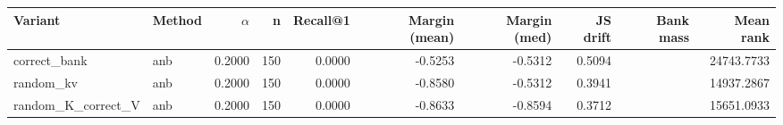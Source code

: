 \begin{tabular}{l l r r r r r r r r}
\toprule
Variant & Method & $\alpha$ & n & Recall@1 & Margin (mean) & Margin (med) & JS drift & Bank mass & Mean rank \\
\midrule
correct\_bank & anb & 0.2000 & 150 & 0.0000 & -0.5253 & -0.5312 & 0.5094 &  & 24743.7733 \\
random\_kv & anb & 0.2000 & 150 & 0.0000 & -0.8580 & -0.5312 & 0.3941 &  & 14937.2867 \\
random\_K\_correct\_V & anb & 0.2000 & 150 & 0.0000 & -0.8633 & -0.8594 & 0.3712 &  & 15651.0933 \\
\bottomrule
\end{tabular}
